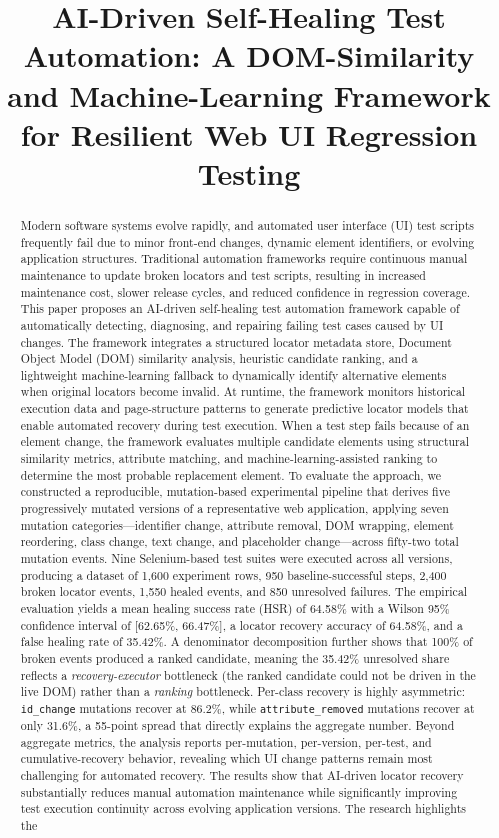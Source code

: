 \documentclass[conference]{IEEEtran}
\title{AI-Driven Self-Healing Test Automation: A DOM-Similarity and Machine-Learning Framework for Resilient Web UI Regression Testing}
\author{
\IEEEauthorblockN{Vijay Javvadi}
\IEEEauthorblockA{Independent Researcher\\
AI-Driven Test Automation and Intelligent Quality Engineering\\
\texttt{jvijayprasad@gmail.com} \quad ORCID: 0009-0005-1083-8207}
}
\begin{document}
\maketitle

\begin{abstract}
Modern software systems evolve rapidly, and automated user interface (UI) test scripts frequently fail due to minor front-end changes, dynamic element identifiers, or evolving application structures. Traditional automation frameworks require continuous manual maintenance to update broken locators and test scripts, resulting in increased maintenance cost, slower release cycles, and reduced confidence in regression coverage. This paper proposes an AI-driven self-healing test automation framework capable of automatically detecting, diagnosing, and repairing failing test cases caused by UI changes. The framework integrates a structured locator metadata store, Document Object Model (DOM) similarity analysis, heuristic candidate ranking, and a lightweight machine-learning fallback to dynamically identify alternative elements when original locators become invalid. At runtime, the framework monitors historical execution data and page-structure patterns to generate predictive locator models that enable automated recovery during test execution. When a test step fails because of an element change, the framework evaluates multiple candidate elements using structural similarity metrics, attribute matching, and machine-learning-assisted ranking to determine the most probable replacement element. To evaluate the approach, we constructed a reproducible, mutation-based experimental pipeline that derives five progressively mutated versions of a representative web application, applying seven mutation categories---identifier change, attribute removal, DOM wrapping, element reordering, class change, text change, and placeholder change---across fifty-two total mutation events. Nine Selenium-based test suites were executed across all versions, producing a dataset of 1{,}600 experiment rows, 950 baseline-successful steps, 2{,}400 broken locator events, 1{,}550 healed events, and 850 unresolved failures. The empirical evaluation yields a mean healing success rate (HSR) of 64.58\% with a Wilson 95\% confidence interval of [62.65\%, 66.47\%], a locator recovery accuracy of 64.58\%, and a false healing rate of 35.42\%. A denominator decomposition further shows that 100\% of broken events produced a ranked candidate, meaning the 35.42\% unresolved share reflects a \emph{recovery-executor} bottleneck (the ranked candidate could not be driven in the live DOM) rather than a \emph{ranking} bottleneck. Per-class recovery is highly asymmetric: \texttt{id\_change} mutations recover at 86.2\%, while \texttt{attribute\_removed} mutations recover at only 31.6\%, a 55-point spread that directly explains the aggregate number. Beyond aggregate metrics, the analysis reports per-mutation, per-version, per-test, and cumulative-recovery behavior, revealing which UI change patterns remain most challenging for automated recovery. The results show that AI-driven locator recovery substantially reduces manual automation maintenance while significantly improving test execution continuity across evolving application versions. The research highlights the 
\end{abstract}
\end{document}
